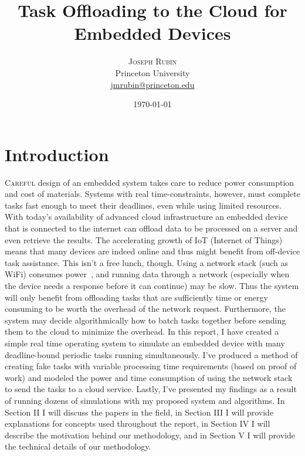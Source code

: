\documentclass[twoside,twocolumn]{article}
\title{Task Offloading to the Cloud for Embedded Devices} %
\author{%
\textsc{Joseph Rubin} \\[1ex] %
\normalsize Princeton University \\ %
\normalsize \href{mailto:jmrubin@princeton.edu}{jmrubin@princeton.edu} %
}
\date{\today} %
\newcommand{\newp}{\newline\indent}
\begin{document}
\maketitle


\section{Introduction}

\lettrine[nindent=0em,lines=3]{C}{areful} design of an embedded system takes care to reduce power consumption and cost of materials.
Systems with real time-constraints, however, must complete tasks fast enough to meet their deadlines, even while using limited resources.
With today's availability of advanced cloud infrastructure an embedded device that is connected to the internet can offload data to be processed on a server and even retrieve the results.
The accelerating growth of IoT (Internet of Things)~\cite{7750968} means that many devices are indeed online and thus might benefit from off-device task assistance.
\newp This isn't a free lunch, though.
Using a network stack (such as WiFi) consumes power~\cite{7545919}, and running data through a network (especially when the device needs a response before it can continue) may be slow.
Thus the system will only benefit from offloading tasks that are sufficiently time or energy consuming to be worth the overhead of the network request.
Furthermore, the system may decide algorithmically how to batch tasks together before sending them to the cloud to minimize the overhead.
\newp In this report, I have created a simple real time operating system to simulate an embedded device with many deadline-bound periodic tasks running simultaneously.
I've produced a method of creating fake tasks with variable processing time requirements (based on proof of work) and modeled the power and time consumption of using the network stack to send the tasks to a cloud service.
Lastly, I've presented my findings as a result of running dozens of simulations with my proposed system and algorithms.
\newp In Section II I will discuss the papers in the field, in Section III I will provide explanations for concepts used throughout the report, in Section IV I will describe the motivation behind our methodology, and in Section V I will provide the technical details of our methodology.
\end{document}
